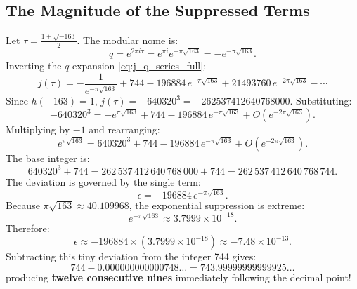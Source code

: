 \documentclass[a4paper]{article}
\begin{document}
\subsection{The Magnitude of the Suppressed Terms}
Let $\tau = \frac{1 + \sqrt{-163}}{2}$. The modular nome is:
\begin{equation}
 q = e^{2\pi i \tau} = e^{\pi i} e^{-\pi \sqrt{163}} = -e^{-\pi \sqrt{163}}.
\end{equation}
Inverting the $q$-expansion \eqref{eq:j_q_series_full}:
\begin{equation}
 j(\tau) = -\frac{1}{e^{-\pi \sqrt{163}}} + 744 - 196884 \, e^{-\pi \sqrt{163}} + 21493760 \, e^{-2\pi \sqrt{163}} - \cdots
\end{equation}
Since $h(-163) = 1$, $j(\tau) = -640320^3 = -262537412640768000$. Substituting:
\begin{equation}
 -640320^3 = -e^{\pi \sqrt{163}} + 744 - 196884 \, e^{-\pi \sqrt{163}} + O(e^{-2\pi \sqrt{163}}).
\end{equation}
Multiplying by $-1$ and rearranging:
\begin{equation}
 e^{\pi \sqrt{163}} = 640320^3 + 744 - 196884 \, e^{-\pi \sqrt{163}} + O(e^{-2\pi \sqrt{163}}).
\end{equation}
The base integer is:
\begin{equation}
 640320^3 + 744 = 262\,537\,412\,640\,768\,000 + 744 = 262\,537\,412\,640\,768\,744.
\end{equation}
The deviation is governed by the single term:
\begin{equation}
 \epsilon = -196884 \, e^{-\pi \sqrt{163}}.
\end{equation}
Because $\pi \sqrt{163} \approx 40.109968$, the exponential suppression is extreme:
\begin{equation}
 e^{-\pi \sqrt{163}} \approx 3.7999 \times 10^{-18}.
\end{equation}
Therefore:
\begin{equation}
 \epsilon \approx -196884 \times (3.7999 \times 10^{-18}) \approx -7.48 \times 10^{-13}.
\end{equation}
Subtracting this tiny deviation from the integer 744 gives:
\begin{equation}
 744 - 0.000000000000748\dots = 743.99999999999925\dots
\end{equation}
producing \textbf{twelve consecutive nines} immediately following the decimal point!
\end{document}

